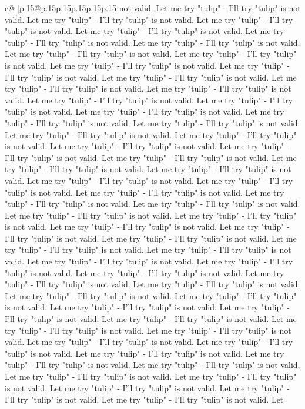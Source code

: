 \documentclass{article}
\begin{document}
{\begin{supertabular}{c@{$\;$}|p{.15\linewidth}@{}p{.15\linewidth}p{.15\linewidth}p{.15\linewidth}p{.15\linewidth}p{.15\linewidth}}
{{{not valid. Let me try "tulip" {-} I'll try "tulip" is not valid. Let me try "tulip" {-} I'll try "tulip" is not valid. Let me try "tulip" {-} I'll try "tulip" is not valid. Let me try "tulip" {-} I'll try "tulip" is not valid. Let me try "tulip" {-} I'll try "tulip" is not valid. Let me try "tulip" {-} I'll try "tulip" is not valid. Let me try "tulip" {-} I'll try "tulip" is not valid. Let me try "tulip" {-} I'll try "tulip" is not valid. Let me try "tulip" {-} I'll try "tulip" is not valid. Let me try "tulip" {-} I'll try "tulip" is not valid. Let me try "tulip" {-} I'll try "tulip" is not valid. Let me try "tulip" {-} I'll try "tulip" is not valid. Let me try "tulip" {-} I'll try "tulip" is not valid. Let me try "tulip" {-} I'll try "tulip" is not valid. Let me try "tulip" {-} I'll try "tulip" is not valid. Let me try "tulip" {-} I'll try "tulip" is not valid. Let me try "tulip" {-} I'll try "tulip" is not valid. Let me try "tulip" {-} I'll try "tulip" is not valid. Let me try "tulip" {-} I'll try "tulip" is not valid. Let me try "tulip" {-} I'll try "tulip" is not valid. Let me try "tulip" {-} I'll try "tulip" is not valid. Let me try "tulip" {-} I'll try "tulip" is not valid. Let me try "tulip" {-} I'll try "tulip" is not valid. Let me try "tulip" {-} I'll try "tulip" is not valid. Let me try "tulip" {-} I'll try "tulip" is not valid. Let me try "tulip" {-} I'll try "tulip" is not valid. Let me try "tulip" {-} I'll try "tulip" is not valid. Let me try "tulip" {-} I'll try "tulip" is not valid. Let me try "tulip" {-} I'll try "tulip" is not valid. Let me try "tulip" {-} I'll try "tulip" is not valid. Let me try "tulip" {-} I'll try "tulip" is not valid. Let me try "tulip" {-} I'll try "tulip" is not valid. Let me try "tulip" {-} I'll try "tulip" is not valid. Let me try "tulip" {-} I'll try "tulip" is not valid. Let me try "tulip" {-} I'll try "tulip" is not valid. Let me try "tulip" {-} I'll try "tulip" is not valid. Let me try "tulip" {-} I'll try "tulip" is not valid. Let me try "tulip" {-} I'll try "tulip" is not valid. Let me try "tulip" {-} I'll try "tulip" is not valid. Let me try "tulip" {-} I'll try "tulip" is not valid. Let me try "tulip" {-} I'll try "tulip" is not valid. Let me try "tulip" {-} I'll try "tulip" is not valid. Let me try "tulip" {-} I'll try "tulip" is not valid. Let me try "tulip" {-} I'll try "tulip" is not valid. Let me try "tulip" {-} I'll try "tulip" is not valid. Let me try "tulip" {-} I'll try "tulip" is not valid. Let me try "tulip" {-} I'll try "tulip" is not valid. Let me try "tulip" {-} I'll try "tulip" is not valid. Let me try "tulip" {-} I'll try "tulip" is not valid. Let me try "tulip" {-} I'll try "tulip" is not valid. Let me try "tulip" {-} I'll try "tulip" is not valid. Let me try "tulip" {-} I'll try "tulip" is not valid. Let me try "tulip" {-} I'll try "tulip" is not valid. Let me try "tulip" {-} I'll try "tulip" is not valid. Let me try "tulip" {-} I'll try "tulip" is not valid. Let me try "tulip" {-} I'll try "tulip" is not valid. Let me try "tulip" {-} I'll try "tulip" is not valid. Let me try "tulip" {-} I'll try "tulip" is not valid. Let me try "tulip" {-} I'll try "tulip" is not valid. Let }}}
\end{supertabular}}
\end{document}
